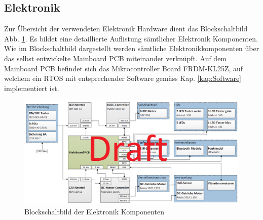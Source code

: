 \subsection{Elektronik}

Zur Übersicht der verwendeten Elektronik Hardware dient das Blockschaltbild Abb. \ref{fig:Blockschaltbild_Komponenten}. Es bildet eine detaillierte Auflistung sämtlicher Elektronik Komponenten. Wie im Blockschaltbild dargestellt werden sämtliche Elektronikkomponenten über das selbst entwickelte Mainboard PCB miteinander verknüpft. Auf dem Mainboard PCB befindet sich das Mikrocontroller Board FRDM-KL25Z, auf welchem ein RTOS mit entsprechender Software gemäss Kap. \ref{kap:Software} implementiert ist.

\begin{figure}[H]
	\includegraphics[width=1\textwidth]{Illustrationen/5-Konzept/Blockschaltbild_Komponenten.png}
	\caption{Blockschaltbild der Elektronik Komponenten}
	\label{fig:Blockschaltbild_Komponenten}
\end{figure}

